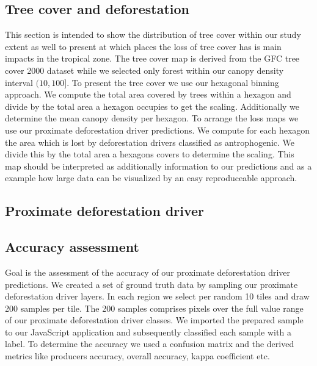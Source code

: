 		\subsection{Tree cover and deforestation}
		\label{subsec:results_tree_cover_and_deforestation}
			 This section is intended to show the distribution of tree cover within our study extent as well to present at which places the loss of tree cover has is main impacts in the tropical zone. The tree cover map is derived from the \ac{GFC} tree cover 2000 dataset while we selected only forest within our canopy density interval $(10,100]$. To present the tree cover we use our hexagonal binning approach. We compute the total area covered by trees within a hexagon and divide by the total area a hexagon occupies to get the scaling. Additionally we determine the mean canopy density per hexagon. To arrange the loss maps we use our proximate deforestation driver predictions. We compute for each hexagon the area which is lost by deforestation drivers classified as antrophogenic. We divide this by the total area a hexagons covers to determine the scaling. This map should be interpreted as additionally information to our predictions and as a example how large data can be visualized by an easy reproduceable approach.

		\subsection{Proximate deforestation driver}
		\label{subsec:results_proxy_deforestation_driver}

		\subsection{Accuracy assessment}
		\label{subsec:results_accuracy_assessment}
		
			 Goal is the assessment of the accuracy of our proximate deforestation driver predictions. We created a set of ground truth data by sampling our proximate deforestation driver layers. In each region we select per random 10 tiles and draw 200 samples per tile. The 200 samples comprises pixels over the full value range of our proximate deforestation driver classes. We imported the prepared sample to our JavaScript application and subsequently classified each sample with a label. To determine the accuracy we used a confusion matrix and the derived metrics like producers accuracy, overall accuracy, kappa coefficient etc.

